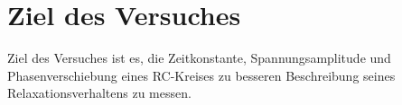 \section{Ziel des Versuches}
\label{sec:versuchsziel}

Ziel des Versuches ist es, die Zeitkonstante, Spannungsamplitude und Phasenverschiebung eines RC-Kreises zu besseren Beschreibung seines Relaxationsverhaltens zu messen.